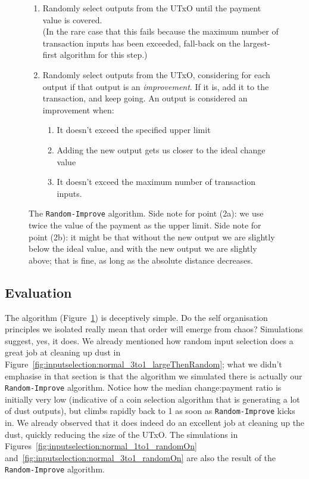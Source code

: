 \documentclass{article}
\theoremstyle{definition}{
  \newtheorem{lemma}{Lemma}[section] %
  \newtheorem{definition}[lemma]{Definition}
}
\theoremstyle{theorem}{
  \newtheorem{invariant}[lemma]{Invariant}
  \newtheorem{proofobligation}[lemma]{Proof Obligation}
}
\numberwithin{equation}{lemma}
\begin{document}
\begin{figure}[t]
\begin{enumerate}
\item Randomly select outputs from the UTxO until the payment value is covered. \\
(In the rare case that this fails because the maximum number of transaction
inputs has been exceeded, fall-back on the largest-first algorithm for this
step.)
\item Randomly select outputs from the UTxO, considering for each output if that
output is an \emph{improvement}. If it is, add it to the transaction, and keep
going. An output is considered an improvement when:
\begin{enumerate}
\item It doesn't exceed the specified upper limit
\item Adding the new output gets us closer to the ideal change value
\item It doesn't exceed the maximum number of transaction inputs.
\end{enumerate}
\end{enumerate}
\caption{\label{fig:RandomImprove}
  The \texttt{Random-Improve} algorithm. Side note for point (2a): we  use twice
  the value of the payment as the upper limit. Side note for point (2b): it
  might be that without the new output we are slightly below the ideal value,
  and with the new output we are slightly above; that is fine, as long as the
  absolute distance decreases.
}
\end{figure}

\subsection{Evaluation}

The algorithm (Figure~\ref{fig:RandomImprove}) is deceptively simple. Do the
self organisation principles we isolated really mean that order will emerge from
chaos? Simulations suggest, yes, it does. We already mentioned how random input
selection does a great job at cleaning up dust in
Figure~\ref{fig:inputselection:normal_3to1_largeThenRandom}; what we didn't
emphasise in that section is that the algorithm we simulated there is actually
our \texttt{Random-Improve} algorithm. Notice how the median change:payment
ratio is initially very low (indicative of a coin selection algorithm that is
generating a lot of dust outputs), but climbs rapidly back to 1 as soon as
\texttt{Random-Improve} kicks in. We already observed that it does indeed do an
excellent job at cleaning up the dust, quickly reducing the size of the UTxO.
The simulations in Figures~\ref{fig:inputselection:normal_1to1_randomOn}
and~\ref{fig:inputselection:normal_3to1_randomOn} are also the result of the
\texttt{Random-Improve} algorithm.
\end{document}

